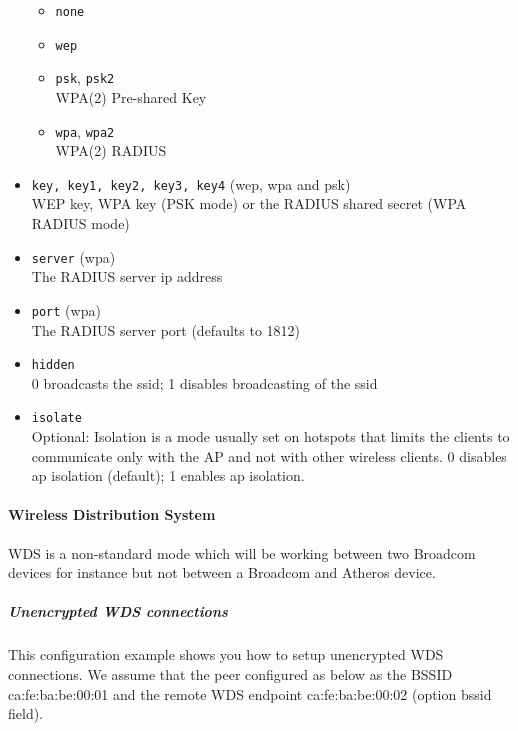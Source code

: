 \begin{itemize}
        \begin{itemize}
	    \item \texttt{none}
	    \item \texttt{wep}
            \item \texttt{psk}, \texttt{psk2} \\
                WPA(2) Pre-shared Key

            \item \texttt{wpa}, \texttt{wpa2} \\
                WPA(2) RADIUS
        \end{itemize}

    \item \texttt{key, key1, key2, key3, key4} (wep, wpa and psk) \\
        WEP key, WPA key (PSK mode) or the RADIUS shared secret (WPA RADIUS mode)

    \item \texttt{server} (wpa) \\
        The RADIUS server ip address

    \item \texttt{port} (wpa) \\
        The RADIUS server port (defaults to 1812)

    \item \texttt{hidden} \\
        0 broadcasts the ssid; 1 disables broadcasting of the ssid

    \item \texttt{isolate} \\
        Optional: Isolation is a mode usually set on hotspots that limits the clients to communicate only with the AP and not with other wireless clients.
        0 disables ap isolation (default); 1 enables ap isolation.

\end{itemize}

\paragraph{Wireless Distribution System}

WDS is a non-standard mode which will be working between two Broadcom devices for instance
but not between a Broadcom and Atheros device.

\subparagraph{Unencrypted WDS connections}

This configuration example shows you how to setup unencrypted WDS connections.
We assume that the peer configured as below as the BSSID ca:fe:ba:be:00:01
and the remote WDS endpoint ca:fe:ba:be:00:02 (option bssid field).

